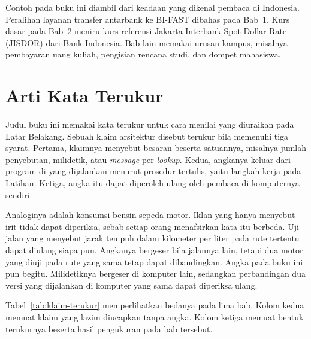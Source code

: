 Contoh pada buku ini diambil dari keadaan yang dikenal pembaca di Indonesia.
Peralihan layanan transfer antarbank ke BI-FAST dibahas pada Bab~1. Kurs dasar
pada Bab~2 meniru kurs referensi Jakarta Interbank Spot Dollar Rate (JISDOR)
dari Bank Indonesia. Bab lain memakai urusan kampus, misalnya pembayaran uang
kuliah, pengisian rencana studi, dan dompet mahasiswa.

\section*{Arti Kata Terukur}

Judul buku ini memakai kata terukur untuk cara menilai yang
diuraikan pada Latar Belakang. Sebuah klaim arsitektur disebut terukur bila
memenuhi tiga syarat. Pertama, klaimnya menyebut besaran beserta satuannya,
misalnya jumlah penyebutan, milidetik, atau \textit{message} per
\textit{lookup}. Kedua, angkanya keluar dari program di  yang
dijalankan menurut prosedur tertulis, yaitu langkah kerja pada Latihan. Ketiga,
angka itu dapat diperoleh ulang oleh pembaca di komputernya sendiri.

Analoginya adalah konsumsi bensin sepeda motor. Iklan yang hanya menyebut irit
tidak dapat diperiksa, sebab setiap orang menafsirkan kata itu berbeda. Uji jalan
yang menyebut jarak tempuh dalam kilometer per liter pada rute tertentu dapat
diulang siapa pun. Angkanya bergeser bila jalannya lain, tetapi dua motor yang
diuji pada rute yang sama tetap dapat dibandingkan. Angka pada buku ini pun
begitu. Milidetiknya bergeser di komputer lain, sedangkan perbandingan dua versi
yang dijalankan di komputer yang sama dapat diperiksa ulang.

Tabel~\ref{tab:klaim-terukur} memperlihatkan bedanya pada lima bab. Kolom kedua
memuat klaim yang lazim diucapkan tanpa angka. Kolom ketiga memuat bentuk
terukurnya beserta hasil pengukuran pada bab tersebut.

